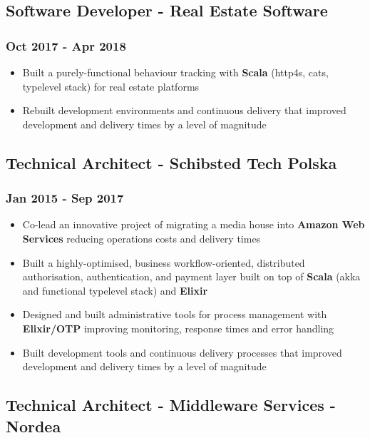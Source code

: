 \documentclass[11pt]{article}
\begin{document}
\subsection*{Software Developer - Real Estate Software}
\label{sec:orgcb312e2}
\subsubsection*{Oct 2017 - Apr 2018}
\label{sec:org176d361}
\begin{itemize}
\item Built a purely-functional behaviour tracking with \textbf{Scala} (http4s, cats, typelevel stack) for real estate platforms
\item Rebuilt development environments and continuous delivery that improved development and delivery times by a level of magnitude
\end{itemize}

\subsection*{Technical Architect - Schibsted Tech Polska}
\label{sec:org6f04066}
\subsubsection*{Jan 2015 - Sep 2017}
\label{sec:orgff11ec9}
\begin{itemize}
\item Co-lead an innovative project of migrating a media house into \textbf{Amazon Web Services} reducing operations costs and delivery times
\item Built a highly-optimised, business workflow-oriented, distributed authorisation, authentication, and payment layer built on top of \textbf{Scala} (akka and functional typelevel stack) and \textbf{Elixir}
\item Designed and built administrative tools for process management with \textbf{Elixir/OTP} improving monitoring, response times and error handling
\item Built development tools and continuous delivery processes that improved development and delivery times by a level of magnitude
\end{itemize}

\subsection*{Technical Architect - Middleware Services - Nordea}
\label{sec:orga791b09}
\end{document}
